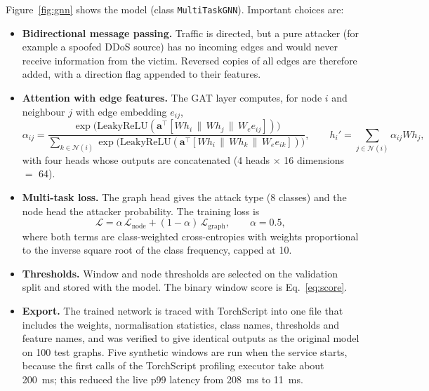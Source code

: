 Figure~\ref{fig:gnn} shows the model (class \texttt{MultiTaskGNN}). Important choices are:
\begin{itemize}
	\item \textbf{Bidirectional message passing.} Traffic is directed, but a pure attacker (for example a spoofed DDoS source) has no incoming edges and would never receive information from the victim. Reversed copies of all edges are therefore added, with a direction flag appended to their features.
	\item \textbf{Attention with edge features.} The GAT layer computes, for node $i$ and neighbour $j$ with edge embedding $e_{ij}$,
	\begin{equation}
	\alpha_{ij}=\frac{\exp\!\big(\mathrm{LeakyReLU}(\mathbf{a}^{\top}[W h_i\,\|\,W h_j\,\|\,W_e e_{ij}])\big)}{\sum_{k\in\mathcal{N}(i)}\exp\!\big(\mathrm{LeakyReLU}(\mathbf{a}^{\top}[W h_i\,\|\,W h_k\,\|\,W_e e_{ik}])\big)},\qquad
	h_i'=\sum_{j\in\mathcal{N}(i)}\alpha_{ij}W h_j,
	\label{eq:gat}
	\end{equation}
	with four heads whose outputs are concatenated (4 heads $\times$ 16 dimensions $=$ 64).
	\item \textbf{Multi-task loss.} The graph head gives the attack type (8 classes) and the node head the attacker probability. The training loss is
	\begin{equation}
	\mathcal{L}=\alpha\,\mathcal{L}_{\text{node}}+(1-\alpha)\,\mathcal{L}_{\text{graph}},\qquad \alpha=0.5,
	\label{eq:loss}
	\end{equation}
	where both terms are class-weighted cross-entropies with weights proportional to the inverse square root of the class frequency, capped at 10.
	\item \textbf{Thresholds.} Window and node thresholds are selected on the validation split and stored with the model. The binary window score is Eq.~\ref{eq:score}.
	\item \textbf{Export.} The trained network is traced with TorchScript into one file that includes the weights, normalisation statistics, class names, thresholds and feature names, and was verified to give identical outputs as the original model on 100 test graphs. Five synthetic windows are run when the service starts, because the first calls of the TorchScript profiling executor take about 200~ms; this reduced the live p99 latency from 208~ms to 11~ms.
\end{itemize}

